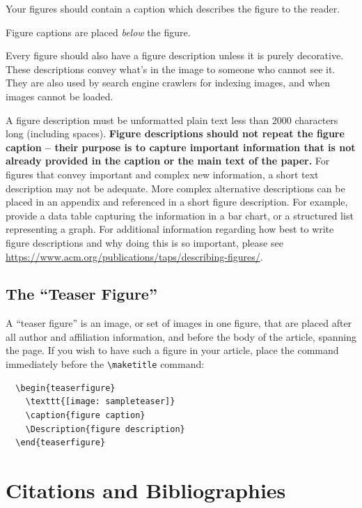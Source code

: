 \documentclass[
acmsmall,
nonacm,
screen,
acmthm]{../templates/acmart}
\begin{document}
Your figures should contain a caption which describes the figure to the
reader.

Figure captions are placed \emph{below} the figure.

Every figure should also have a figure description unless it is purely
decorative. These descriptions convey what's in the image to someone who
cannot see it. They are also used by search engine crawlers for indexing
images, and when images cannot be loaded.

A figure description must be unformatted plain text less than 2000
characters long (including spaces). \textbf{Figure descriptions should
not repeat the figure caption -- their purpose is to capture important
information that is not already provided in the caption or the main text
of the paper.} For figures that convey important and complex new
information, a short text description may not be adequate. More complex
alternative descriptions can be placed in an appendix and referenced in
a short figure description. For example, provide a data table capturing
the information in a bar chart, or a structured list representing a
graph. For additional information regarding how best to write figure
descriptions and why doing this is so important, please see
\url{https://www.acm.org/publications/taps/describing-figures/}.

\hypertarget{the-teaser-figure}{%
\subsection{The ``Teaser Figure''}\label{the-teaser-figure}}

A ``teaser figure'' is an image, or set of images in one figure, that
are placed after all author and affiliation information, and before the
body of the article, spanning the page. If you wish to have such a
figure in your article, place the command immediately before the
\texttt{\textbackslash{}maketitle} command:

\begin{verbatim}
  \begin{teaserfigure}
    \texttt{[image: sampleteaser]}
    \caption{figure caption}
    \Description{figure description}
  \end{teaserfigure}
\end{verbatim}

\hypertarget{citations-and-bibliographies}{%
\section{Citations and
Bibliographies}\label{citations-and-bibliographies}}
\end{document}
